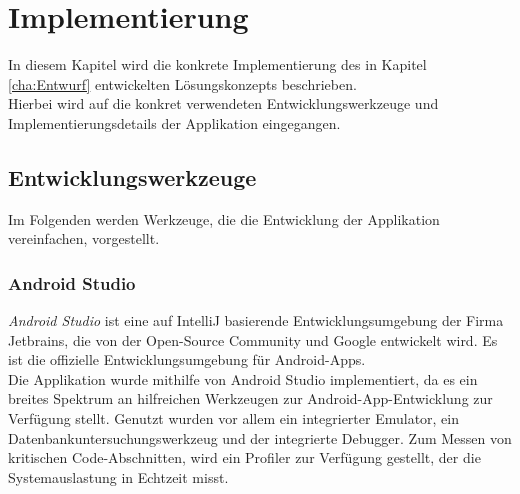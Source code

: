 \documentclass[oneside]{ausarbeitung}
\begin{document}
\chapter{Implementierung}
\label{cha:implementierung}
In diesem Kapitel wird die konkrete Implementierung des in Kapitel
\ref{cha:Entwurf} entwickelten Lösungskonzepts beschrieben.\\
Hierbei wird auf die konkret verwendeten Entwicklungswerkzeuge und Implementierungsdetails der Applikation eingegangen.
\section{Entwicklungswerkzeuge}
Im Folgenden werden Werkzeuge, die die Entwicklung der Applikation vereinfachen, vorgestellt.
\subsection{Android Studio}
\textit{Android Studio} ist eine auf IntelliJ basierende Entwicklungsumgebung der Firma Jetbrains, die von der Open-Source Community und Google entwickelt wird. Es ist die offizielle Entwicklungsumgebung für Android-Apps.\\
Die Applikation wurde mithilfe von Android Studio implementiert, da es ein breites Spektrum an hilfreichen Werkzeugen zur Android-App-Entwicklung zur Verfügung stellt. Genutzt wurden vor allem ein integrierter Emulator, ein Datenbankuntersuchungswerkzeug und der integrierte Debugger. Zum Messen von kritischen Code-Abschnitten, wird ein Profiler zur Verfügung gestellt, der die Systemauslastung in Echtzeit misst.
\end{document}
